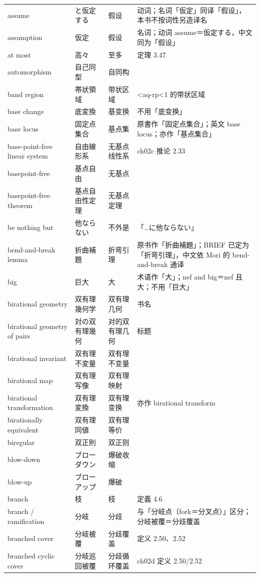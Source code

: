 \begin{longtable}{@{}>{\raggedright\arraybackslash}p{}>{\raggedright\arraybackslash}p{}>{\raggedright\arraybackslash}p{}>{\raggedright\arraybackslash}p{}@{}}
assume & と仮定する & 假设 & 动词；名词「仮定」同译「假设」，本书不按词性另造译名 \\
assumption & 仮定 & 假设 & 名词；动词 assume＝仮定する，中文同为「假设」 \\
at most & 高々 & 至多 & 定理 3.47 \\
automorphism & 自己同型 & 自同构 &  \\
band region & 帯状領域 & 带状区域 & 0<aq-rp<1 的带状区域 \\
base change & 底変換 & 基变换 & 不用「底变换」 \\
base locus & 固定点集合 & 基点集 & 原書作「固定点集合」；英文 base locus；亦作「基点集合」 \\
base-point-free linear system & 自由線形系 & 无基点线性系 & ch02c 推论 2.33 \\
basepoint-free & 基点自由 & 无基点 &  \\
basepoint-free theorem & 基点自由性定理 & 无基点定理 &  \\
be nothing but & 他ならない & 不外是 & 「…に他ならない」 \\
bend-and-break lemma & 折曲補題 & 折弯引理 & 原书作「折曲補題」；BRIEF 已定为「折弯引理」，中文依 Mori 的 bend-and-break 通译 \\
big & 巨大 & 大 & 术语作「大」；nef and big＝nef 且大；不用「巨大」 \\
birational geometry & 双有理幾何学 & 双有理几何 & 书名 \\
birational geometry of pairs & 対の双有理幾何 & 对的双有理几何 & 3.30 标题 \\
birational invariant & 双有理不変量 & 双有理不变量 &  \\
birational map & 双有理写像 & 双有理映射 &  \\
birational transformation & 双有理変換 & 双有理变换 & 亦作 birational transform \\
birationally equivalent & 双有理同値 & 双有理等价 &  \\
biregular & 双正則 & 双正则 &  \\
blow-down & ブローダウン & 爆破收缩 &  \\
blow-up & ブローアップ & 爆破 &  \\
branch & 枝 & 枝 & 定義 4.6 \\
branch / ramification & 分岐 & 分歧 & 与「分岐点（fork＝分叉点）」区分；分岐被覆＝分歧覆盖 \\
branched cover & 分岐被覆 & 分歧覆盖 & 定义 2.50、2.52 \\
branched cyclic cover & 分岐巡回被覆 & 分歧循环覆盖 & ch02d 定义 2.50/2.52 \\

\end{longtable}
